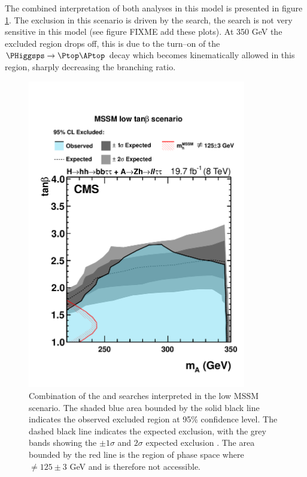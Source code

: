 The combined interpretation of both analyses in this model is presented in figure \ref{fig:HhhAZhMSSM}.
The exclusion in this scenario is driven by the \AtoZh search, the \Htohh search is not
very sensitive in this model (see figure FIXME add these plots). At 350 GeV the excluded
region drops off, this is due to the turn--on of the
$\PHiggsps \rightarrow \ttbar$ decay which becomes kinematically allowed in this region, 
sharply decreasing the \AtoZh branching ratio.

\begin{figure}[h!]
\begin{center}
\includegraphics[width=0.85\textwidth]{Hhh/Plots/CMS-HIG-14-034_Figure_011.pdf}
\caption{Combination of the \AtoZhtolltautau and \Htohhtobbtautau searches
interpreted in the low \tanb MSSM scenario. The shaded blue area bounded by
the solid black line indicates the observed excluded region at 95\% confidence level.
The dashed black line indicates the expected exclusion, with the grey bands showing
the $\pm 1\sigma$ and $2\sigma$ expected exclusion \cite{CMS-HIG-14-034}. The area
bounded by the red line is the region of phase space where \mh $\neq 125 \pm 3$ 
GeV and is therefore not accessible.}
\label{fig:HhhAZhMSSM}
\end{center}
\end{figure}
